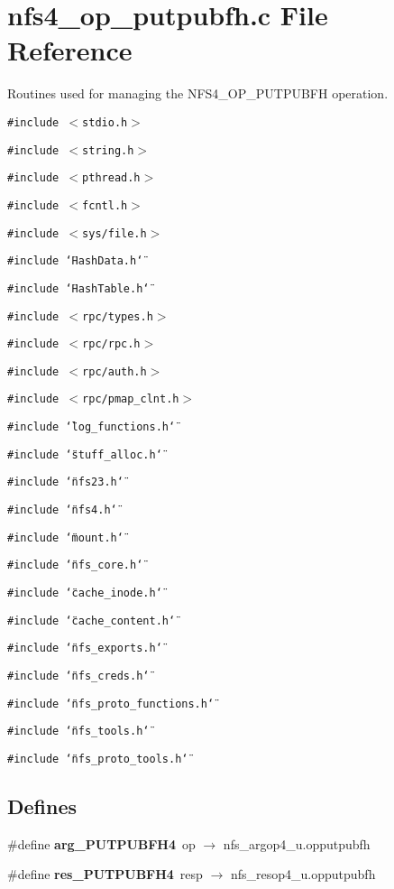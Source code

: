 \section{nfs4\_\-op\_\-putpubfh.c File Reference}
\label{nfs4__op__putpubfh_8c}
Routines used for managing the NFS4\_\-OP\_\-PUTPUBFH operation. 

{\tt \#include $<$stdio.h$>$}\par
{\tt \#include $<$string.h$>$}\par
{\tt \#include $<$pthread.h$>$}\par
{\tt \#include $<$fcntl.h$>$}\par
{\tt \#include $<$sys/file.h$>$}\par
{\tt \#include \char`\"{}Hash\-Data.h\char`\"{}}\par
{\tt \#include \char`\"{}Hash\-Table.h\char`\"{}}\par
{\tt \#include $<$rpc/types.h$>$}\par
{\tt \#include $<$rpc/rpc.h$>$}\par
{\tt \#include $<$rpc/auth.h$>$}\par
{\tt \#include $<$rpc/pmap\_\-clnt.h$>$}\par
{\tt \#include \char`\"{}log\_\-functions.h\char`\"{}}\par
{\tt \#include \char`\"{}stuff\_\-alloc.h\char`\"{}}\par
{\tt \#include \char`\"{}nfs23.h\char`\"{}}\par
{\tt \#include \char`\"{}nfs4.h\char`\"{}}\par
{\tt \#include \char`\"{}mount.h\char`\"{}}\par
{\tt \#include \char`\"{}nfs\_\-core.h\char`\"{}}\par
{\tt \#include \char`\"{}cache\_\-inode.h\char`\"{}}\par
{\tt \#include \char`\"{}cache\_\-content.h\char`\"{}}\par
{\tt \#include \char`\"{}nfs\_\-exports.h\char`\"{}}\par
{\tt \#include \char`\"{}nfs\_\-creds.h\char`\"{}}\par
{\tt \#include \char`\"{}nfs\_\-proto\_\-functions.h\char`\"{}}\par
{\tt \#include \char`\"{}nfs\_\-tools.h\char`\"{}}\par
{\tt \#include \char`\"{}nfs\_\-proto\_\-tools.h\char`\"{}}\par
\subsection*{Defines}
\begin{CompactItemize}
\item 
\#define {\bf arg\_\-PUTPUBFH4}\ op $\rightarrow$ nfs\_\-argop4\_\-u.opputpubfh
\item 
\#define {\bf res\_\-PUTPUBFH4}\ resp $\rightarrow$ nfs\_\-resop4\_\-u.opputpubfh
\end{CompactItemize}
